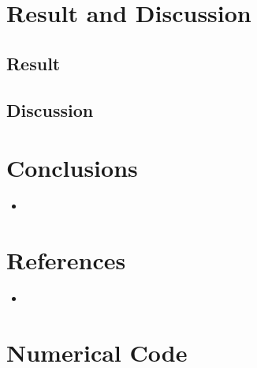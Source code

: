 \documentclass{article}
\begin{document}
\section{Result and Discussion}
\subsection{Result}

\subsection{Discussion}

\section{Conclusions}
\begin{itemize}
\item 
\end{itemize}

\section{References}

\begin{itemize}
    \item 
\end{itemize}

\section{Numerical Code}
\begin{lstlisting}[title={}]

\end{lstlisting}
\end{document}
